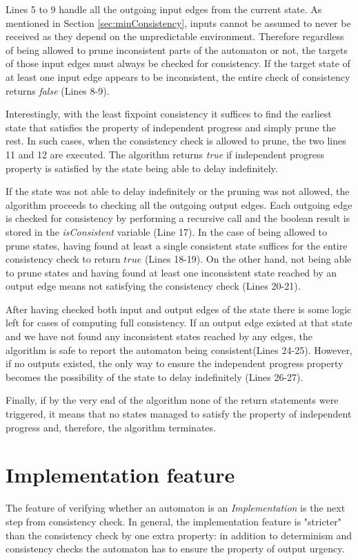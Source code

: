 Lines 5 to 9 handle all the outgoing input edges from the current state. As mentioned in Section \ref{sec:minConsistency}, inputs cannot be assumed to never be received as they depend on the unpredictable environment. Therefore regardless of being allowed to prune inconsistent parts of the automaton or not, the targets of those input edges must always be checked for consistency. If the target state of at least one input edge appears to be inconsistent, the entire check of consistency returns \textit{false} (Lines 8-9).

Interestingly, with the least fixpoint consistency it suffices to find the earliest state that satisfies the property of independent progress and simply prune the rest. In such cases, when the consistency check is allowed to prune, the two lines 11 and 12 are executed. The algorithm returns \textit{true} if independent progress property is satisfied by the state being able to delay indefinitely.

If the state was not able to delay indefinitely or the pruning was not allowed, the algorithm proceeds to checking all the outgoing output edges. Each outgoing edge is checked for consistency by performing a recursive call and the boolean result is stored in the \textit{isConsistent} variable (Line 17). In the case of being allowed to prune states, having found at least a single consistent state suffices for the entire consistency check to return $true$ (Lines 18-19). On the other hand, not being able to prune states and having found at least one inconsistent state reached by an output edge means not satisfying the consistency check (Lines 20-21).

After having checked both input and output edges of the state there is some logic left for cases of computing full consistency. If an output edge existed at that state and we have not found any inconsistent states reached by any edges, the algorithm is safe to report the automaton being consistent(Lines 24-25). However, if no outputs existed, the only way to ensure the independent progress property becomes the possibility of the state to delay indefinitely (Lines 26-27). 

Finally, if by the very end of the algorithm none of the return statements were triggered, it means that no states managed to satisfy the property of independent progress and, therefore, the algorithm terminates.

\section{Implementation feature}
The feature of verifying whether an automaton is an \textit{Implementation} is the next step from consistency check. In general, the implementation feature is "stricter" than the consistency check by one extra property: in addition to determinism and consistency checks the automaton has to ensure the property of output urgency.

